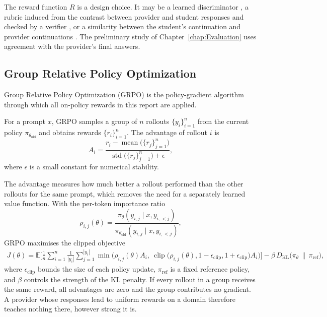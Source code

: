 The reward function $R$ is a design choice. It may be a learned discriminator
\autocite{ye_gad_2025}, a rubric induced from the contrast between provider and
student responses and checked by a verifier \autocite{fang_ropd_2026}, or a
similarity between the student's continuation and provider continuations
\autocite{zhou_omniopd_2026}. The preliminary study of Chapter~\ref{chap:Evaluation} uses agreement with the
provider's final answers.

\subsection{Group Relative Policy Optimization}

Group Relative Policy Optimization (GRPO) \autocite{shao_deepseekmath_grpo_2024} is
the policy-gradient algorithm through which all on-policy rewards in this report are
applied.

\begin{Definitions}
For a prompt $x$, GRPO samples a group of $n$ rollouts $\{y_i\}_{i=1}^{n}$ from the
current policy $\pi_{\theta_{\mathrm{old}}}$ and obtains rewards $\{r_i\}_{i=1}^{n}$.
The advantage of rollout $i$ is
\[
  A_i = \frac{r_i - \operatorname{mean}\big(\{r_j\}_{j=1}^{n}\big)}
             {\operatorname{std}\big(\{r_j\}_{j=1}^{n}\big) + \epsilon},
\]
where $\epsilon$ is a small constant for numerical stability.
\end{Definitions}

The advantage measures how much better a rollout performed than the other rollouts
for the same prompt, which removes the need for a separately learned value function.
With the per-token importance ratio
\[
  \rho_{i,j}(\theta) =
  \frac{\pi_\theta(y_{i,j} \mid x, y_{i,<j})}
       {\pi_{\theta_{\mathrm{old}}}(y_{i,j} \mid x, y_{i,<j})},
\]
GRPO maximises the clipped objective
\begin{align*}
  J(\theta) = \mathbb{E}\Bigg[ \frac{1}{n} \sum_{i=1}^{n} \frac{1}{|y_i|}
  \sum_{j=1}^{|y_i|} \min\!\Big( \rho_{i,j}(\theta) A_i,\ 
  \operatorname{clip}\big(\rho_{i,j}(\theta), 1 - \epsilon_{\mathrm{clip}},
  1 + \epsilon_{\mathrm{clip}}\big) A_i \Big) \Bigg]
  - \beta \, D_{\mathrm{KL}}\big(\pi_\theta \,\|\, \pi_{\mathrm{ref}}\big),
\end{align*}
where $\epsilon_{\mathrm{clip}}$ bounds the size of each policy update,
$\pi_{\mathrm{ref}}$ is a fixed reference policy, and $\beta$ controls the strength of
the KL penalty. If every rollout in a group receives the same reward, all advantages
are zero and the group contributes no gradient. A provider whose responses lead to
uniform rewards on a domain therefore teaches nothing there, however strong it is.

